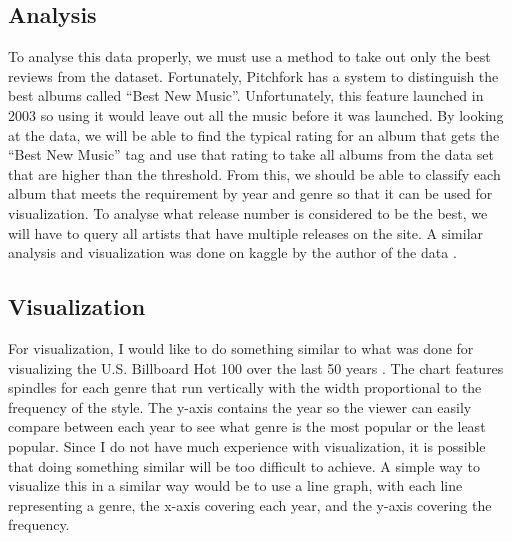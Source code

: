 \documentclass{article}
\begin{document}
\subsection{Analysis}\label{analysis}

To analyse this data properly, we must use a method to take out only the
best reviews from the dataset. Fortunately, Pitchfork has a system to
distinguish the best albums called ``Best New Music''. Unfortunately,
this feature launched in 2003 so using it would leave out all the music
before it was launched. By looking at the data, we will be able to find
the typical rating for an album that gets the ``Best New Music'' tag and
use that rating to take all albums from the data set that are higher
than the threshold. From this, we should be able to classify each album
that meets the requirement by year and genre so that it can be used for
visualization. To analyse what release number is considered to be the
best, we will have to query all artists that have multiple releases on
the site. A similar analysis and visualization was done on kaggle by the
author of the data \citep{kaggleFirst}.

\subsection{Visualization}\label{visualization}

For visualization, I would like to do something similar to what was done
for visualizing the U.S. Billboard Hot 100 over the last 50 years
\citep{BillboardFigure}. The chart features spindles for each genre that
run vertically with the width proportional to the frequency of the
style. The y-axis contains the year so the viewer can easily compare
between each year to see what genre is the most popular or the least
popular. Since I do not have much experience with visualization, it is
possible that doing something similar will be too difficult to achieve.
A simple way to visualize this in a similar way would be to use a line
graph, with each line representing a genre, the x-axis covering each
year, and the y-axis covering the frequency.



\end{document}
